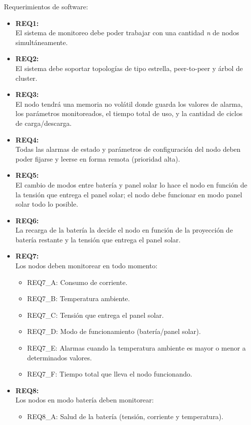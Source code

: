 \noindent Requerimientos de software:
\begin{itemize}
	\item \textbf{REQ1:}\\ El sistema de monitoreo debe poder trabajar con una cantidad \textit{n} de nodos simultáneamente.
	\item \textbf{REQ2:}\\ El sistema debe soportar topologías de tipo estrella, peer-to-peer y árbol de cluster.
	\item \textbf{REQ3:}\\ El nodo tendrá una memoria no volátil donde guarda los valores de alarma, los parámetros monitoreados, el tiempo total de uso, y la cantidad de ciclos de carga/descarga.
	\item \textbf{REQ4:}\\ Todas las alarmas de estado y parámetros de configuración del nodo deben poder fijarse y leerse en forma remota (prioridad alta).	
	\item \textbf{REQ5:}\\ El cambio de modos entre batería y panel solar lo hace el nodo en función de la tensión que entrega el panel solar; el nodo debe funcionar en modo panel solar todo lo posible.
	\item \textbf{REQ6:}\\ La recarga de la batería la decide el nodo en función de la proyección de batería restante y la tensión que entrega el panel solar.	
	\item \textbf{REQ7:}\\ Los nodos deben monitorear en todo momento:	
	\begin{itemize}
		\item REQ7\_A: Consumo de corriente.
		\item REQ7\_B: Temperatura ambiente.
		\item REQ7\_C: Tensión que entrega el panel solar.
		\item REQ7\_D: Modo de funcionamiento (batería/panel solar).
		\item REQ7\_E: Alarmas cuando la temperatura ambiente es mayor o menor a determinados valores.
		\item REQ7\_F: Tiempo total que lleva el nodo funcionando.
		\end{itemize}
	\item \textbf{REQ8:}\\Los nodos en modo batería deben monitorear:
		\begin{itemize}
		\item REQ8\_A: Salud de la batería (tensión, corriente y temperatura).

\end{itemize}
\end{itemize}
